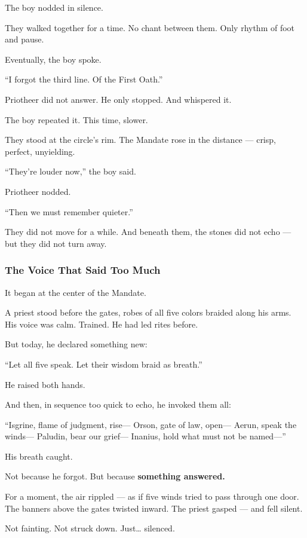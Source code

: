 \documentclass[12pt]{article}
\begin{document}
The boy nodded in silence.

They walked together for a time.  
No chant between them.  
Only rhythm of foot and pause.

Eventually, the boy spoke.

 “I forgot the third line.  
 Of the First Oath.”

Priotheer did not answer.  
He only stopped.  
And whispered it.

The boy repeated it.  
This time, slower.

They stood at the circle’s rim.  
The Mandate rose in the distance — crisp, perfect, unyielding.

 “They’re louder now,” the boy said.

Priotheer nodded.

 “Then we must remember quieter.”

They did not move for a while.  
And beneath them, the stones did not echo —  
but they did not turn away.

\dotfill

\subsubsection{The Voice That Said Too Much}

It began at the center of the Mandate.

A priest stood before the gates,  
robes of all five colors braided along his arms.  
His voice was calm. Trained.  
He had led rites before.

But today, he declared something new:

 “Let all five speak.  
 Let their wisdom braid as breath.”

He raised both hands.

And then, in sequence too quick to echo,  
he invoked them all:

 “Isgrine, flame of judgment, rise—  
Orson, gate of law, open—  
Aerun, speak the winds—  
Paludin, bear our grief—  
Inanius, hold what must not be named—”

His breath caught.

Not because he forgot.  
But because \textbf{something answered.}

For a moment, the air rippled — as if five winds tried to pass through one door.  
The banners above the gates twisted inward.  
The priest gasped — and fell silent.

Not fainting.  
Not struck down.  
Just… silenced.
\end{document}
